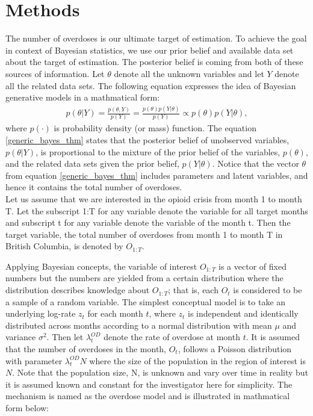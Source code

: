 \documentclass[12pt]{article}
\begin{document}
\section{Methods}

\normalsize 
The number of overdoses is our ultimate target of estimation. To achieve the goal in context of Bayesian statistics, we use our prior belief and available data set about the target of estimation. The posterior belief is coming from both of these sources of information. Let $\theta$ denote all the unknown variables and let $Y$ denote all the related data sets. The following equation expresses the idea of Bayesian generative models in a mathmatical form:
\begin{equation}
\label{generic_bayes_thm}
\left.\begin{aligned}
p(\theta| Y ) = \frac{ p(\theta, Y)   }{ p(Y)} = \frac{ p(\theta) p(Y|\theta)}{ p(Y)} \propto p(\theta) p(Y| \theta), \end{aligned}\right.
\end{equation}
where $p(\cdot)$ is probability density (or mass) function. The equation \ref{generic_bayes_thm} states that the posterior belief of unobserved variables, $p(\theta|Y)$, is proportional to the mixture of the prior belief of the variables, $p(\theta)$, and the related data sets given the prior belief, $p(Y|\theta)$. Notice that the vector $\theta$ from equation \ref{generic_bayes_thm} includes parameters and latent variables, and hence it contains the total number of overdoses. \\

Let us assume that we are interested in the opioid crisis from month 1 to month T.  Let the subscript 1:T for any variable denote the variable for all target months and subscript t for any variable denote the variable of the month t. Then the target variable, the total number of overdoses from month 1 to month T  in British Columbia, is denoted by $O_{1:T}$.

Applying Bayesian concepts, the variable of interest $O_{1:T}$ is a vector of fixed numbers but the numbers are yielded from a certain distribution where the distribution describes knowledge about $O_{1:T}$; that is, each $O_t$ is considered to be a sample of a random variable. 
The simplest conceptual model is to take an underlying log-rate $z_t$ for each month $t$, where $z_t$ is independent and identically distributed across months according to a normal distribution with mean $\mu$ and variance $\sigma^2$. \cite{Irvine:modelling} Then let $\lambda_{t}^{OD}$ denote the rate of overdose at month $t$. It is assumed that the number of overdoses in the month, $O_t$, follows a Poisson distribution with parameter $\lambda_{t}^{OD}N$ where the size of the population in the region of interest is $N$. Note that the population size, N, is unknown and vary over time in reality but it is assumed known and constant for the investigator here for simplicity. The mechanism is named as the overdose model  and is illustrated in mathmatical form below:
\end{document}
